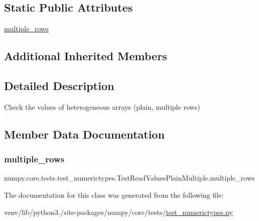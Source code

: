 \subsection*{Static Public Attributes}
\begin{DoxyCompactItemize}
\item 
\hyperlink{classnumpy_1_1core_1_1tests_1_1test__numerictypes_1_1TestReadValuesPlainMultiple_a329ae734ad5128f5239d2408fe13e763}{multiple\+\_\+rows}
\end{DoxyCompactItemize}
\subsection*{Additional Inherited Members}


\subsection{Detailed Description}
\begin{DoxyVerb}Check the values of heterogeneous arrays (plain, multiple rows)\end{DoxyVerb}
 

\subsection{Member Data Documentation}
\mbox{\label{classnumpy_1_1core_1_1tests_1_1test__numerictypes_1_1TestReadValuesPlainMultiple_a329ae734ad5128f5239d2408fe13e763}} 
\subsubsection{\texorpdfstring{multiple\+\_\+rows}{multiple\_rows}}
{\footnotesize\ttfamily numpy.\+core.\+tests.\+test\+\_\+numerictypes.\+Test\+Read\+Values\+Plain\+Multiple.\+multiple\+\_\+rows\hspace{0.3cm}{\ttfamily [static]}}



The documentation for this class was generated from the following file\+:\begin{DoxyCompactItemize}
\item 
venv/lib/python3./site-\/packages/numpy/core/tests/\hyperlink{test__numerictypes_8py}{test\+\_\+numerictypes.\+py}\end{DoxyCompactItemize}
